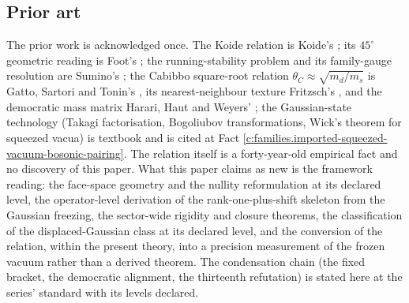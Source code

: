 \documentclass[11pt]{article}
\theoremstyle{definition}
\theoremstyle{plain}
\begin{document}
\subsection*{Prior art}
\label{c:note.families.setting-prior-art}
The prior work is acknowledged once. The Koide relation is Koide's \cite{Koide1982}; its $45^{\circ}$ geometric reading is Foot's \cite{Foot1994}; the running-stability problem and its family-gauge resolution are Sumino's \cite{Sumino2009}; the Cabibbo square-root relation $\theta_{C} \approx \sqrt{m_{d}/m_{s}}$ is Gatto, Sartori and Tonin's \cite{GST1968}, its nearest-neighbour texture Fritzsch's \cite{Fritzsch1978}, and the democratic mass matrix Harari, Haut and Weyers' \cite{HHW1978}; the Gaussian-state technology (Takagi factorisation, Bogoliubov transformations, Wick's theorem for squeezed vacua) is textbook and is cited at Fact \ref{c:families.imported-squeezed-vacuum-bosonic-pairing}. The relation itself is a forty-year-old empirical fact and no discovery of this paper. What this paper claims as new is the framework reading: the face-space geometry and the nullity reformulation at its declared level, the operator-level derivation of the rank-one-plus-shift skeleton from the Gaussian freezing, the sector-wide rigidity and closure theorems, the classification of the displaced-Gaussian class at its declared level, and the conversion of the relation, within the present theory, into a precision measurement of the frozen vacuum rather than a derived theorem. The condensation chain (the fixed bracket, the democratic alignment, the thirteenth refutation) is stated here at the series' standard with its levels declared.
\end{document}
